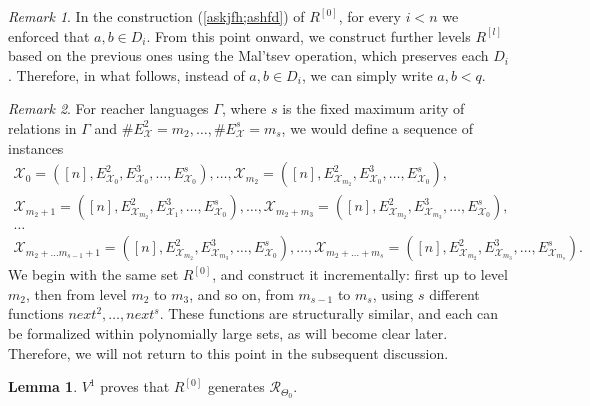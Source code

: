 \documentclass{article}
\theoremstyle{definition}
\theoremstyle{theorem}
\newtheorem{lem}{Lemma}
\theoremstyle{theorem}
\theoremstyle{remark}
\theoremstyle{remark}
\newtheorem{rem}{Remark}
\theoremstyle{example}
\theoremstyle{notation}
\theoremstyle{theorem}
\begin{document}
\begin{rem}
In the construction (\ref{askjfh;ashfd}) of $R^{[0]}$, for every $i < n$ we enforced that $a, b \in D_i$. From this point onward, we construct further levels $R^{[l]}$ based on the previous ones using the Mal'tsev operation, which preserves each $D_i$. Therefore, in what follows, instead of $a, b \in D_i$, we can simply write $a, b < q$.
\end{rem}

\begin{rem}
    For reacher languages $\Gamma$, where $s$ is the fixed maximum arity of relations in $\Gamma$ and $\#E^2_{\mathcal{X}} = m_2,\ldots,\#E^s_{\mathcal{X}} = m_s$, we would define a sequence of instances 
\begin{gather*}
    \mathcal{X}_0 = ([n], E^2_{\mathcal{X}_0},E^3_{\mathcal{X}_0},\ldots,E^s_{\mathcal{X}_0}),\ldots,\mathcal{X}_{m_2} = ([n], E^2_{\mathcal{X}_{m_2}},E^3_{\mathcal{X}_0},\ldots,E^s_{\mathcal{X}_0}),\\
    \mathcal{X}_{m_2+1} = ([n], E^2_{\mathcal{X}_{m_2}},E^3_{\mathcal{X}_1},\ldots,E^s_{\mathcal{X}_0}),\ldots,\mathcal{X}_{m_2+m_3} = ([n], E^2_{\mathcal{X}_{m_2}},E^3_{\mathcal{X}_{m_3}},\ldots,E^s_{\mathcal{X}_0}),\\
    \ldots \\
\mathcal{X}_{m_2+\ldots m_{s-1}+1} = ([n], E^2_{\mathcal{X}_{m_2}},E^3_{\mathcal{X}_{m_3}},\ldots,E^s_{\mathcal{X}_0}),\ldots,\mathcal{X}_{m_2+\ldots +m_s} = ([n], E^2_{\mathcal{X}_{m_2}},E^3_{\mathcal{X}_{m_3}},\ldots,E^s_{\mathcal{X}_{m_s}}).
    \end{gather*}    
We begin with the same set $R^{[0]}$, and construct it incrementally: first up to level $m_2$, then from level $m_2$ to $m_3$, and so on, from $m_{s-1}$ to $m_s$, using $s$ different functions $next^2, \ldots, next^s$. These functions are structurally similar, and each can be formalized within polynomially large sets, as will become clear later. Therefore, we will not return to this point in the subsequent discussion. 
\end{rem}

 \begin{lem}
      $V^1$ proves that $R^{[0]}$ generates $\mathscr{R}_{\Theta_0}$.
 \end{lem}
\end{document}
